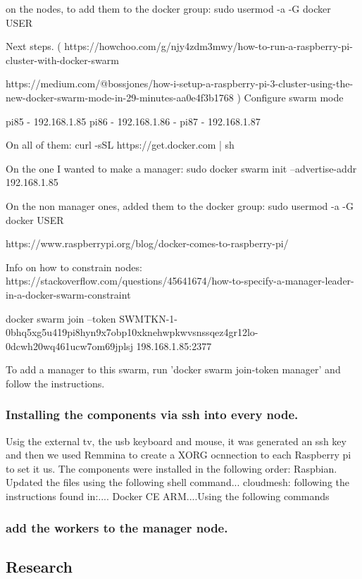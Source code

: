 \documentclass[sigconf]{acmart}
\begin{document}
	on the nodes, to add them to the docker group:
	sudo usermod -a -G docker USER
	
	Next steps.  (
	https://howchoo.com/g/njy4zdm3mwy/how-to-run-a-raspberry-pi-cluster-with-docker-swarm
	
	https://medium.com/@bossjones/how-i-setup-a-raspberry-pi-3-cluster-using-the-new-docker-swarm-mode-in-29-minutes-aa0e4f3b1768
	)
	Configure swarm mode
	
	pi85 -  192.168.1.85
	pi86 -  192.168.1.86 -
	pi87 -  192.168.1.87
	
	On all of them:
	curl -sSL https://get.docker.com | sh
	
	On the one I wanted to make a manager:
	sudo docker swarm init --advertise-addr 192.168.1.85
	
	On the non manager ones, added them to the docker group:
	sudo usermod -a -G docker USER
	
	https://www.raspberrypi.org/blog/docker-comes-to-raspberry-pi/
	
	Info on how to constrain nodes: https://stackoverflow.com/questions/45641674/how-to-specify-a-manager-leader-in-a-docker-swarm-constraint
	
	docker swarm join --token SWMTKN-1-0bhq5xg5u419pi8hyn9x7obp10xknehwpkwvsnssqez4gr12lo-0dcwh20wq461ucw7om69jplsj 198.168.1.85:2377
	
	To add a manager to this swarm, run 'docker swarm join-token manager' and follow the instructions.
	
	
	\subsubsection{Installing the components via ssh into every node.}
	Usig the external tv, the usb keyboard and mouse, it was generated an ssh key and then we used Remmina to create a XORG ocnnection  to each Raspberry pi to set it us.
	The components were installed in the following order:
	Raspbian.
	Updated the files using the following shell command...
	cloudmesh: following the instructions found in:....
	Docker CE ARM....Using the following commands
	
	\subsubsection{add the workers to the manager node.}
	
	
	\subsection{Research}
	
\end{document}

